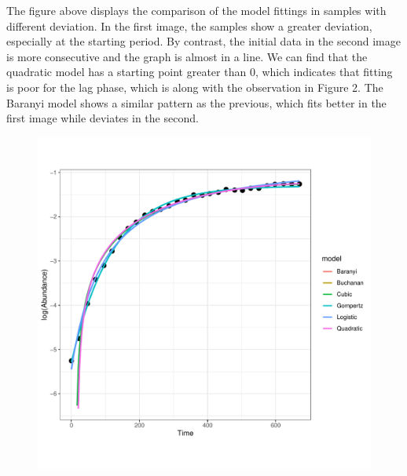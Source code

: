 \documentclass[11pt, oneside]{article}
\begin{document}
		\noindent The figure above displays the comparison of the model fittings in samples with different deviation. In the first image, the samples show a greater deviation, especially at the starting period. By contrast, the initial data in the second image is more consecutive and the graph is almost in a line. We can find that the quadratic model has a starting point greater than 0, which indicates that fitting is poor for the lag phase, which is along with the observation in Figure 2. The Baranyi model shows a similar pattern as the previous, which fits better in the first image while deviates in the second. 
		
		\begin{figure}[H]
			\begin{center}
			\begin{minipage}{.5\textwidth}
				\centering
				\includegraphics[page=178, scale = 0.5]{plot_subsets.pdf}
			\end{minipage}%
			\begin{minipage}{.5\textwidth}
				\centering

\end{minipage}
\end{center}
\end{figure}
\end{document}
